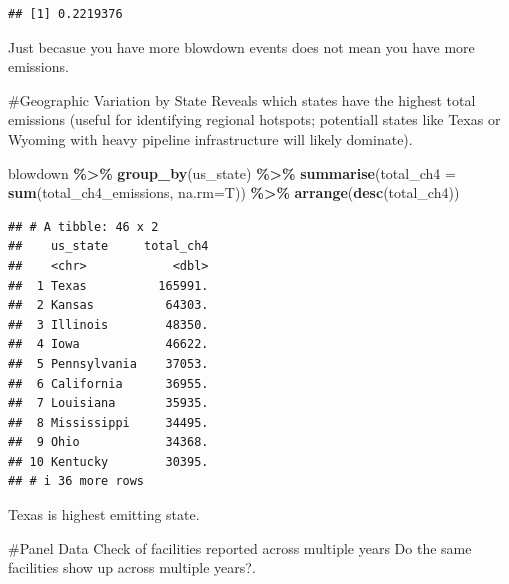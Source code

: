 \documentclass[
]{article}
\newenvironment{Shaded}{\begin{snugshade}}{\end{snugshade}}
\newcommand{\AttributeTok}[1]{\textcolor[rgb]{0.13,0.29,0.53}{#1}}
\newcommand{\FunctionTok}[1]{\textcolor[rgb]{0.13,0.29,0.53}{\textbf{#1}}}
\newcommand{\NormalTok}[1]{#1}
\newcommand{\SpecialCharTok}[1]{\textcolor[rgb]{0.81,0.36,0.00}{\textbf{#1}}}
\begin{document}
\begin{verbatim}
## [1] 0.2219376
\end{verbatim}

Just becasue you have more blowdown events does not mean you have more
emissions.

\#Geographic Variation by State Reveals which states have the highest
total emissions (useful for identifying regional hotspots; potentiall
states like Texas or Wyoming with heavy pipeline infrastructure will
likely dominate).

\begin{Shaded}
\begin{Highlighting}[]
\NormalTok{blowdown }\SpecialCharTok{\%\textgreater{}\%} \FunctionTok{group\_by}\NormalTok{(us\_state) }\SpecialCharTok{\%\textgreater{}\%}
  \FunctionTok{summarise}\NormalTok{(}\AttributeTok{total\_ch4 =} \FunctionTok{sum}\NormalTok{(total\_ch4\_emissions, }\AttributeTok{na.rm=}\NormalTok{T)) }\SpecialCharTok{\%\textgreater{}\%}
  \FunctionTok{arrange}\NormalTok{(}\FunctionTok{desc}\NormalTok{(total\_ch4))}
\end{Highlighting}
\end{Shaded}

\begin{verbatim}
## # A tibble: 46 x 2
##    us_state     total_ch4
##    <chr>            <dbl>
##  1 Texas          165991.
##  2 Kansas          64303.
##  3 Illinois        48350.
##  4 Iowa            46622.
##  5 Pennsylvania    37053.
##  6 California      36955.
##  7 Louisiana       35935.
##  8 Mississippi     34495.
##  9 Ohio            34368.
## 10 Kentucky        30395.
## # i 36 more rows
\end{verbatim}

Texas is highest emitting state.

\#Panel Data Check of facilities reported across multiple years Do the
same facilities show up across multiple years?.
\end{document}
